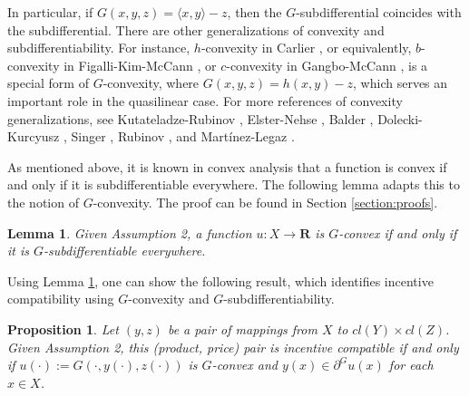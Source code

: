 \documentclass[a4paper, 11pt]{amsart}
\numberwithin{equation}{section}
\theoremstyle{plain}
\newtheorem{lemma}[theorem]{Lemma}
\newtheorem{proposition}[theorem]{Proposition}
\theoremstyle{definition}
\theoremstyle{remark}
\newcommand{\R}{\mathbf{R}}
\begin{document}
In particular, if $G(x,y,z) = \langle x, y \rangle - z$, then the $G$-subdifferential coincides with the subdifferential. There are other generalizations of convexity and subdifferentiability. For instance, $h$-convexity in Carlier \cite{Carlier01}, or equivalently, $b$-convexity in Figalli-Kim-McCann \cite{FigalliKimMcCann11}, or $c$-convexity in  Gangbo-McCann \cite{GangboMcCann96}, is a special form of $G$-convexity, where $G(x,y,z)=  h(x,y) -z$, which serves an important role in the quasilinear case. For more references of convexity generalizations, see Kutateladze-Rubinov \cite{KutateladzeRubinov72}, Elster-Nehse \cite{ElsterNehse74}, Balder \cite{Balder77}, Dolecki-Kurcyusz \cite{DoleckiKurcyusz78},  Singer \cite{Singer97},  Rubinov \cite{Rubinov00a}, and Martínez-Legaz \cite{MartinezLegaz05}.\medskip


As mentioned above, it is known in convex analysis that a function is convex if and only if it is subdifferentiable everywhere. The following lemma adapts this to the notion of $G$-convexity. The proof can be found in Section \ref{section:proofs}.

\begin{lemma}\label{convex-subdiff}
	Given Assumption 2, a function $u: X \rightarrow \R$ is $G$-convex if and only if it is $G$-subdifferentiable everywhere.
\end{lemma}

Using Lemma \ref{convex-subdiff}, one can show the following result, which identifies incentive compatibility using $G$-convexity and $G$-subdifferentiability.

\begin{proposition}\label{incen/convex}
	Let $(y,z)$ be a pair of mappings from $X$ to $cl(Y) \times cl(Z)$. Given Assumption 2, this (product, price) pair is incentive compatible %
	if and only if $u(\cdot):=G(\cdot,y(\cdot),z(\cdot))$ is $G$-convex and $y(x)\in \partial^G u(x)$ for each $x \in X$.
\end{proposition}
\end{document}

